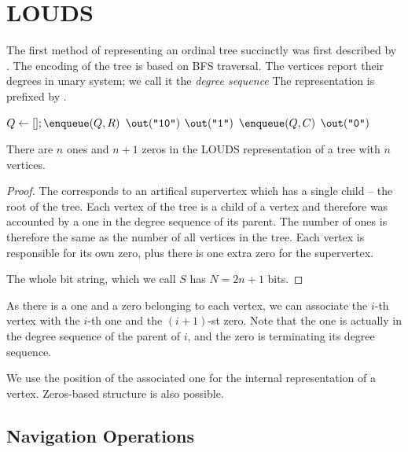 \section{LOUDS}

The first method of representing an ordinal tree succinctly was first described by \cite{jacobson1989space}.
The encoding of the tree is based on BFS traversal.
The vertices report their degrees in unary system; we call it the \emph{degree sequence}
The representation is prefixed by .

\begin{algorithmic}
	\State $Q \gets []; \enqueue(Q, R)$ 
	\State $\out(\str{10})$
			\State $\out(\str1)$
			\State $\enqueue(Q, C)$
		\EndFor
		\State $\out(\str0)$
	\EndWhile
\EndFunction
\end{algorithmic}

\begin{lemma}
	There are $n$ ones and $n+1$ zeros in the LOUDS representation of a tree with $n$ vertices.
\end{lemma}
\begin{proof}
	The  corresponds to an artifical supervertex which has a single child -- the root of the tree.
	Each vertex of the tree is a child of a vertex and therefore was accounted by a one in the degree sequence of its parent.
	The number of ones is therefore the same as the number of all vertices in the tree.
	Each vertex is responsible for its own zero, plus there is one extra zero for the supervertex.
	
	The whole bit string, which we call $S$ has $N = 2n + 1$ bits.
\end{proof}

As there is a one and a zero belonging to each vertex, we can associate the $i$-th vertex with the $i$-th one and the $(i+1)$-st zero.
Note that the one is actually in the degree sequence of the parent of $i$, and the zero is terminating its degree sequence.

We use the position of the associated one for the internal representation of a vertex.
Zeros-based structure is also possible. \cite{rahman2006engineering}

\subsection{Navigation Operations}

